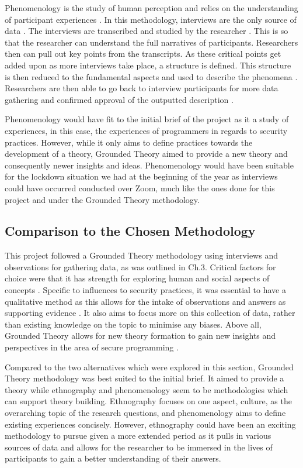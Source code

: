 Phenomenology is the study of human perception and relies on the understanding of participant experiences \cite{ethno}. In this methodology, interviews are the only source of data \cite{ethno}. The interviews are transcribed and studied by the researcher \cite{ethno}. This is so that the researcher can understand the full narratives of participants. Researchers then can pull out key points from the transcripts. As these critical points get added upon as more interviews take place, a structure is defined. This structure is then reduced to the fundamental aspects and used to describe the phenomena \cite{ethno}. Researchers are then able to go back to interview participants for more data gathering and confirmed approval of the outputted description \cite{ethno}. 
\newline
\par
Phenomenology would have fit to the initial brief of the project as it a study of experiences, in this case, the experiences of programmers in regards to security practices. However, while it only aims to define practices towards the development of a theory, Grounded Theory aimed to provide a new theory and consequently newer insights and ideas. Phenomenology would have been suitable for the lockdown situation we had at the beginning of the year as interviews could have occurred conducted over Zoom, much like the ones done for this project and under the Grounded Theory methodology. 

\subsection{Comparison to the Chosen Methodology}

\par This project followed a Grounded Theory methodology using interviews and observations for gathering data, as was outlined in Ch.3. Critical factors for choice were that it has strength for exploring human and social aspects of concepts \cite{geeks}. Specific to influences to security practices, it was essential to have a qualitative method as this allows for the intake of observations and answers as supporting evidence \cite{geeks}. It also aims to focus more on this collection of data, rather than existing knowledge on the topic to minimise any biases. Above all, Grounded Theory allows for new theory formation to gain new insights and perspectives in the area of secure programming \cite{geeks}.
\newline
\par
Compared to the two alternatives which were explored in this section, Grounded Theory methodology was best suited to the initial brief. It aimed to provide a theory while ethnography and phenomenology seem to be methodologies which can support theory building. Ethnography focuses on one aspect, culture, as the overarching topic of the research questions, and phenomenology aims to define existing experiences concisely. However, ethnography could have been an exciting methodology to pursue given a more extended period as it pulls in various sources of data and allows for the researcher to be immersed in the lives of participants to gain a better understanding of their answers.  

